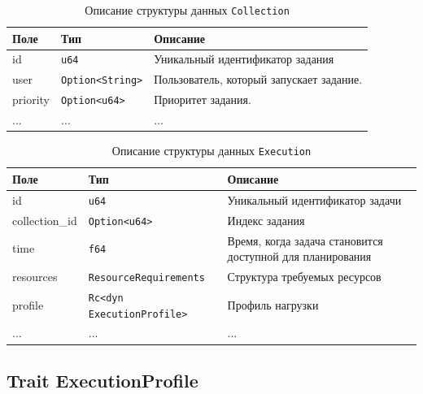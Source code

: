 \documentclass[t]{beamer}  %
\begin{document}
	\begin{frame}[fragile]
		\frametitle{\insertsection} 
		\framesubtitle{\insertsubsection}

		\begin{table}[H]
			\scriptsize
			\centering
			\begin{tabular}{|l|l|p{7cm}|}
				\hline
				\textbf{Поле} & \textbf{Тип} & \textbf{Описание} \\ 
				\hline
				id & \texttt{u64} & Уникальный идентификатор задания \\
				\hline
				user & \texttt{Option<String>} & Пользователь, который запускает задание.  \\
				\hline
				priority & \texttt{Option<u64>} & Приоритет задания. \\
				\hline
				... & ... & ... \\
				\hline
			\end{tabular}
			\caption*{Описание структуры данных \texttt{Collection}}
			\label{tab:collection}
		\end{table}

\vspace{-0.5cm}

\begin{table}[h]
    \centering
	\scriptsize
    \begin{tabular}{|l|l|p{5cm}|}
        \hline
        \textbf{Поле} & \textbf{Тип} & \textbf{Описание} \\
        \hline
        id & \texttt{u64} & Уникальный идентификатор задачи \\
        \hline
        collection\_id & \texttt{Option<u64>} & Индекс задания  \\
        \hline
        time & \texttt{f64} & Время, когда задача становится доступной для планирования \\
		\hline
        resources & \texttt{ResourceRequirements} & Структура требуемых ресурсов \\
        \hline
        profile & \texttt{Rc<dyn ExecutionProfile>} & Профиль нагрузки \\
        \hline
		... & ... & ... \\
		\hline
    \end{tabular}
    \caption*{Описание структуры данных \texttt{Execution}}
\end{table}

	\end{frame}



\subsection{Trait ExecutionProfile}
\end{document}
